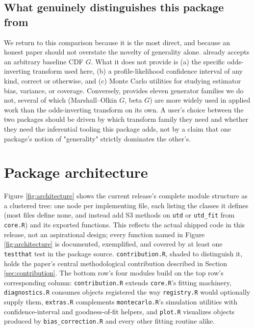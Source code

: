 \subsection{What genuinely distinguishes this package from }

We return to this comparison because it is the most direct, and because
an honest paper should not overstate the novelty of generality alone.
 already accepts an arbitrary baseline CDF $G$. What it
does not provide is (a) the specific odds-inverting transform used here,
(b) a profile-likelihood confidence interval of any kind, correct or
otherwise, and (c) Monte Carlo utilities for studying estimator bias,
variance, or coverage. Conversely,  provides eleven
generator families we do not, several of which (Marshall--Olkin $G$,
beta $G$) are more widely used in applied work than the odds-inverting
transform on its own. A user's choice between the two packages should
be driven by which transform family they need and whether they need the
inferential tooling this package adds, not by a claim that one
package's notion of "generality" strictly dominates the other's.

\section{Package architecture}
\label{sec:architecture}

Figure \ref{fig:architecture} shows the current release's complete
module structure as a clustered tree: one node per implementing file,
each listing the classes it defines (most files define none, and
instead add S3 methods on \texttt{utd} or \texttt{utd\_fit} from
\texttt{core.R}) and its exported functions. This reflects the actual
shipped code in this release, not an aspirational design; every
function named in Figure \ref{fig:architecture} is documented,
exemplified, and covered by at least one \texttt{testthat} test in the
package source. \texttt{contribution.R}, shaded to distinguish it, holds
the paper's central methodological contribution described in Section
\ref{sec:contribution}. The bottom row's four modules build on the top
row's corresponding column: \texttt{contribution.R} extends
\texttt{core.R}'s fitting machinery, \texttt{diagnostics.R} consumes
objects registered the way \texttt{registry.R} would optionally supply
them, \texttt{extras.R} complements \texttt{montecarlo.R}'s simulation
utilities with confidence-interval and goodness-of-fit helpers, and
\texttt{plot.R} visualizes objects produced by
\texttt{bias\_correction.R} and every other fitting routine alike.

